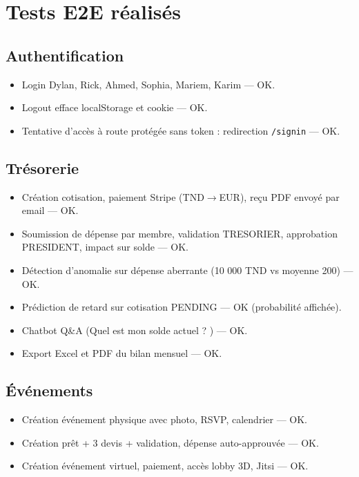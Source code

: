 \documentclass[11pt,a4paper]{report}
\begin{document}
\chapter{Tests E2E réalisés}

\section{Authentification}
\begin{itemize}
  \item Login Dylan, Rick, Ahmed, Sophia, Mariem, Karim — OK.
  \item Logout efface localStorage et cookie — OK.
  \item Tentative d'accès à route protégée sans token : redirection
        \texttt{/signin} — OK.
\end{itemize}

\section{Trésorerie}
\begin{itemize}
  \item Création cotisation, paiement Stripe (TND\(\rightarrow\)EUR), reçu PDF
        envoyé par email — OK.
  \item Soumission de dépense par membre, validation TRESORIER, approbation
        PRESIDENT, impact sur solde — OK.
  \item Détection d'anomalie sur dépense aberrante (10 000 TND vs moyenne 200) — OK.
  \item Prédiction de retard sur cotisation PENDING — OK (probabilité affichée).
  \item Chatbot Q\&A (\og Quel est mon solde actuel ? \fg) — OK.
  \item Export Excel et PDF du bilan mensuel — OK.
\end{itemize}

\section{Événements}
\begin{itemize}
  \item Création événement physique avec photo, RSVP, calendrier — OK.
  \item Création prêt + 3 devis + validation, dépense auto-approuvée — OK.
  \item Création événement virtuel, paiement, accès lobby 3D, Jitsi — OK.
\end{itemize}
\end{document}

